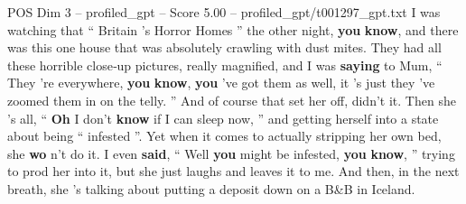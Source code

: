 \begin{textsample}{POS Dim 3 – profiled\_gpt – Score 5.00 – profiled\_gpt/t001297\_gpt.txt}  \label{ex:f3_pos_024}
I was watching that “ Britain ’s Horror Homes ” the other night, \textbf{you} \textbf{know}, and there was this one house that was absolutely crawling with dust mites.
They had all these horrible close‑up pictures, really magnified, and I was \textbf{saying} to Mum, “ They ’re everywhere, \textbf{you} \textbf{know}, \textbf{you} ’ve got them as well, it ’s just they ’ve zoomed them in on the telly. ” And of course that set her off, didn't it.
Then she ’s all, “ \textbf{Oh} I don't \textbf{know} if I can sleep now, ” and getting herself into a state about being “ infested ”.
Yet when it comes to actually stripping her own bed, she \textbf{wo} n’t do it.
I even \textbf{said}, “ Well \textbf{you} might be infested, \textbf{you} \textbf{know}, ” trying to prod her into it, but she just laughs and leaves it to me.
And then, in the next breath, she ’s talking about putting a deposit down on a B\&B in Iceland.

\end{textsample}
